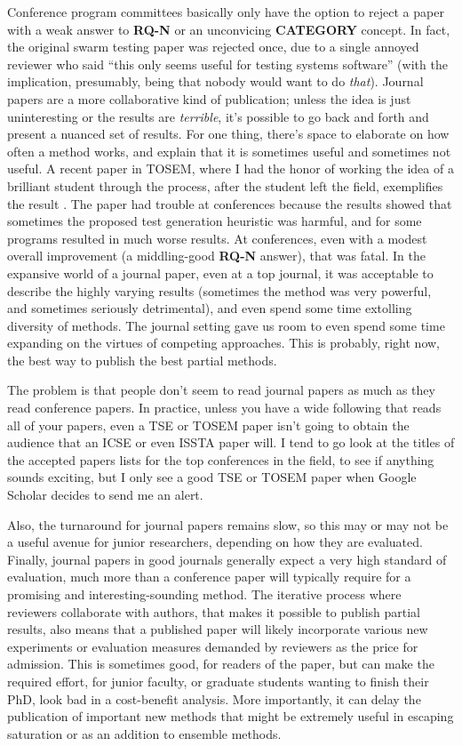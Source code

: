 \documentclass[sigplan,review]{acmart}
\begin{document}
Conference program committees basically only have the option to reject
a paper with a weak answer to {\bf RQ-N} or an unconvicing {\bf
  CATEGORY} concept.  In fact, the original swarm testing paper was
rejected once, due to a single annoyed reviewer who said ``this only seems useful for
testing systems software'' (with the implication, presumably, being
that nobody would want to do \emph{that}).  Journal papers are a more
collaborative kind of publication; unless the idea is just
uninteresting or the results are \emph{terrible}, it's possible to go
back and forth and present a nuanced set of results.  For one thing,
there's space to elaborate on how often a method works, and explain
that it is sometimes useful and sometimes not useful.  A recent paper
in TOSEM, where I had the honor of working the idea of a brilliant
student through the process, after the student left the field,
exemplifies the result \cite{HolmesLOC}.  The paper had trouble at
conferences because the results showed that sometimes the proposed
test generation heuristic was harmful, and for some programs resulted
in much worse results.  At conferences, even with a modest overall
improvement (a middling-good {\bf RQ-N} answer), that was fatal.  In
the expansive world of a journal paper, even at a top journal, it was
acceptable to describe the highly varying results (sometimes the
method was very powerful, and sometimes seriously detrimental), and
even spend some time extolling diversity of methods.  The journal
setting gave us room to even spend some time expanding on the virtues
of competing approaches.  This is probably, right now, the best way to
publish the best partial methods.

The problem is that people don't seem to read journal papers as much
as they read conference papers.  In practice, unless you have a wide
following that reads all of your papers, even a TSE or TOSEM paper
isn't going to obtain the audience that an ICSE or even ISSTA paper
will.  I tend to go look at the titles of the accepted papers lists for the
top conferences in the field, to see if anything sounds exciting, but I only see a good TSE or TOSEM
paper when Google Scholar decides to send me an alert.

Also, the turnaround for journal papers remains slow, so this
may or may not be a useful avenue for junior researchers, depending on
how they are evaluated.  Finally, journal papers in good journals generally expect a
very high standard of evaluation, much more than a conference paper
will typically require for a promising and interesting-sounding
method.  The iterative process where reviewers collaborate with
authors, that makes it possible to publish partial results, also means
that a published paper will likely incorporate various new experiments
or evaluation measures demanded by reviewers as the price for
admission.  This is sometimes good, for readers of the paper, but can make the required effort,
for junior faculty, or graduate students wanting to finish their PhD,
look bad in a cost-benefit analysis.  More importantly, it can delay
the publication of important new methods that might be extremely
useful in escaping saturation or as an addition to ensemble methods.
\end{document}

